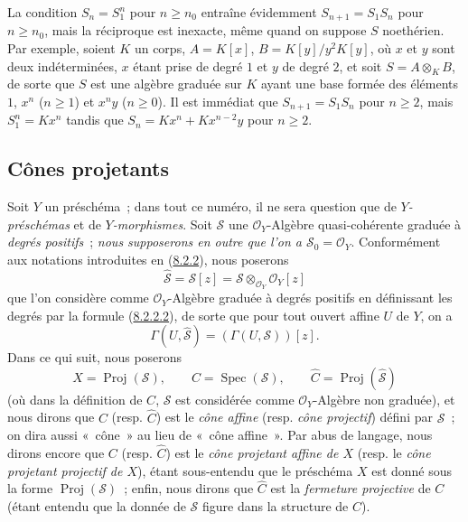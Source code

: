 \begin{remark}[8.2.15]
\label{II.8.2.15-fr}
La condition $S_n=S_1^n$ pour $n\geq n_0$ entraîne évidemment
$S_{n+1}=S_1S_n$ pour $n\geq n_0$, mais la réciproque est inexacte, même
quand on suppose $S$ noethérien. Par exemple, soient $K$ un corps,
$A=K[x]$, $B=K[y]/y^2K[y]$, où $x$ et $y$ sont deux indéterminées, $x$ étant
prise de degré $1$ et $y$ de degré $2$, et soit $S=A\otimes_KB$, de sorte que
$S$ est une algèbre graduée sur $K$ ayant une base formée des éléments $1$,
$x^n$ ($n\geq1$) et $x^ny$ ($n\geq0$). Il est immédiat que
$S_{n+1}=S_1S_n$ pour $n\geq2$, mais $S_1^n=Kx^n$ tandis que
$S_n=Kx^n+Kx^{n-2}y$ pour $n\geq2$.
\end{remark}

\subsection{Cônes projetants}
\label{subsection:II.8.3-fr}

\begin{env}[8.3.1]
\label{II.8.3.1-fr}
Soit $Y$ un préschéma~; dans tout ce numéro, il ne sera question que de
\emph{$Y$-préschémas} et de \emph{$Y$-morphismes}. Soit $\mathcal{S}$ une
$\mathcal{O}_Y$-Algèbre quasi-cohérente graduée à \emph{degrés positifs}~;
\emph{nous supposerons en outre que l'on a $\mathcal{S}_0=\mathcal{O}_Y$}.
Conformément aux notations introduites en
(\hyperref[II.8.2.2-fr]{8.2.2}), nous poserons
\begin{equation}
\label{II.8.3.1.1-fr}
  \widehat{\mathcal{S}}=\mathcal{S}[z]
  =\mathcal{S}\otimes_{\mathcal{O}_Y}\mathcal{O}_Y[z]
\tag{8.3.1.1}
\end{equation}
que l'on considère comme $\mathcal{O}_Y$-Algèbre graduée à degrés positifs en
définissant les degrés par la formule
(\hyperref[II.8.2.2.2-fr]{8.2.2.2}), de sorte que pour tout ouvert affine $U$
de $Y$, on a
\[
  \Gamma(U,\widehat{\mathcal{S}})=(\Gamma(U,\mathcal{S}))[z].
\]
Dans ce qui suit, nous poserons
\begin{equation}
\label{II.8.3.1.2-fr}
  X=\operatorname{Proj}(\mathcal{S}),\qquad
  C=\operatorname{Spec}(\mathcal{S}),\qquad
  \widehat{C}=\operatorname{Proj}(\widehat{\mathcal{S}})
\tag{8.3.1.2}
\end{equation}
(où dans la définition de $C$, $\mathcal{S}$ est considérée comme
$\mathcal{O}_Y$-Algèbre non graduée), et nous dirons que $C$ (resp.
$\widehat{C}$) est le \emph{cône affine} (resp. \emph{cône projectif}) défini
par $\mathcal{S}$~; on dira aussi «~cône~» au lieu de «~cône affine~». Par
abus de langage, nous dirons encore que $C$ (resp. $\widehat{C}$) est le
\emph{cône projetant affine de $X$} (resp. le \emph{cône projetant projectif
de $X$}), étant sous-entendu que le préschéma $X$ est donné sous la forme
$\operatorname{Proj}(\mathcal{S})$~; enfin, nous dirons que $\widehat{C}$ est
la \emph{fermeture projective} de $C$ (étant entendu que la donnée de
$\mathcal{S}$ figure dans la structure de $C$).
\end{env}

